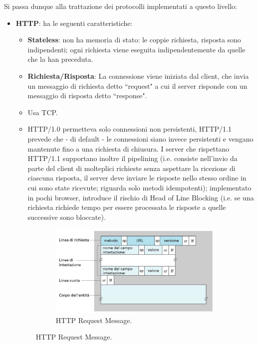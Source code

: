 \documentclass[11pt, italian, openany]{book}
\begin{document}
\begin{sloppypar}
Si passa dunque alla trattazione dei protocolli implementati a questo livello:
\begin{itemize}[topsep=0pt]
	\itemsep-0.3em
	\item \textbf{HTTP}: ha le seguenti caratteristiche:
	\vspace{-3.5mm}
	\begin{itemize}
		\itemsep-0.3em
		\item \textbf{Stateless}: non ha memoria di stato: le coppie richiesta, risposta sono indipendenti; ogni richiesta viene eseguita indipendentemente
		da quelle che la han preceduta.
		\item \textbf{Richiesta/Risposta}: La connessione viene iniziata dal client, che invia un messaggio di richiesta detto ``request" a cui il server
		risponde con un messaggio di risposta detto ``response".
		\item Usa TCP.
		\item HTTP/1.0 permetteva solo connessioni non persistenti, HTTP/1.1 prevede che - di default - le connessioni siano invece persistenti e vengano
		mantenute fino a una richiesta di chiusura. I server che rispettano HTTP/1.1 supportano inoltre il pipelining (i.e. consiste nell’invio da parte del
		client di molteplici richieste senza aspettare la ricezione di ciascuna risposta, il server deve inviare le risposte nello stesso ordine in cui
		sono state ricevute; riguarda solo metodi idempotenti); implementato in pochi browser, introduce il rischio di Head of Line Blocking (i.e. se una
		richiesta richiede tempo per essere processata le risposte a quelle successive sono bloccate).
	\end{itemize}
\pagebreak
	\begin{figure}[h!]
		\begin{subfigure}{0.49 \linewidth} \centering
			\includegraphics[scale=0.25]{images/http-request.png}
			\caption{HTTP Request Message.}

\end{subfigure}
\end{figure}
\end{itemize}
\end{sloppypar}
\end{document}
